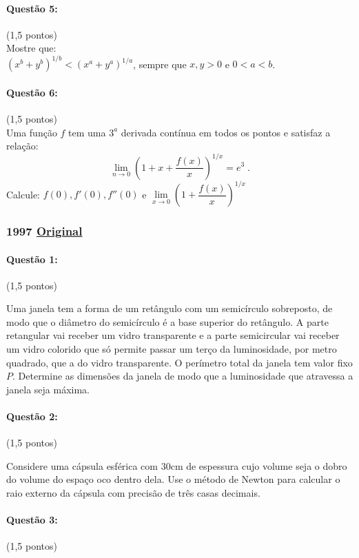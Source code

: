 \documentclass[12pt,a4paper]{article}
\newcommand{\original}[1]{\tiny \href{#1}{Original} \normalsize}
\begin{document}
\paragraph{Questão 5:}(1,5 pontos)\\
Mostre que:\\
$(x^b+y^b)^{1/b}<(x^a+y^a)^{1/a}$, sempre que $x,y>0$  e  $0<a<b$.

\paragraph{Questão 6:}(1,5 pontos)\\
Uma função $f$ tem uma $3^a$ derivada contínua em todos os pontos e satisfaz a relação:
$$\lim\limits_{n\to 0}\left( 1+x+\dfrac{f(x)}{x}\right)^{1/x}=e^3\;.$$
Calcule: $f(0),f'(0),f''(0)$ e $\lim\limits_{x\to 0}\left(1+\dfrac{f(x)}{x}\right)^{1/x}$


\newpage

\subsubsection{1997 \original{https://drive.google.com/open?id=1-Ie2NamXz-5rITK6ZTzeSxAOnevdjILy}}

\paragraph{Questão 1:} (1,5 pontos)

Uma janela tem a forma de um retângulo com um semicírculo sobreposto, de modo que o diâmetro do semicírculo é a base superior do retângulo. A parte retangular vai receber um vidro transparente e a parte semicircular vai receber um vidro colorido que só permite passar um terço da luminosidade, por metro quadrado, que a do vidro transparente. O perímetro total da janela tem valor fixo $P$. Determine as dimensões da janela de modo que a luminosidade que atravessa a janela seja máxima.

\paragraph{Questão 2:} (1,5 pontos)

Considere uma cápsula esférica com $30$cm de espessura cujo volume seja o dobro do volume do espaço oco dentro dela. Use o método de Newton para calcular o raio externo da cápsula com precisão de três casas decimais.

\paragraph{Questão 3:} (1,5 pontos)
\end{document}
